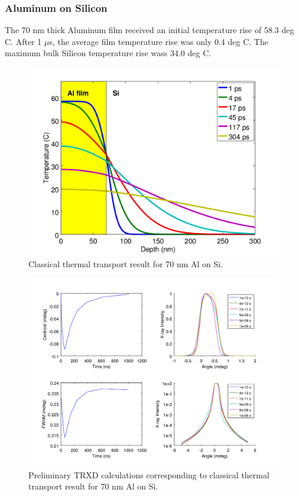 \documentclass[letterpaper,11pt]{article}
\begin{document}
\subsubsection{Aluminum on Silicon}
The 70 nm thick Aluminum film received an initial temperature rise of 58.3 deg C. After 1 $\mu$s, the average film temperature rise was only 0.4 deg C.  The maximum bulk Silicon temperature rise wass 34.0 deg C.
\begin{figure}
\includegraphics[scale = 0.65]{Si_Temp.png}
\caption{Classical thermal transport result for 70 nm Al on Si.}
\end{figure}
\begin{figure}
\includegraphics[scale = 0.65]{Si_TRXD.png}
\caption{Preliminary TRXD calculations corresponding to classical thermal transport result for 70 nm Al on Si.}
\end{figure}
\newpage
\end{document}
